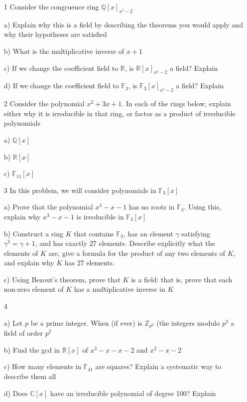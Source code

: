 \documentclass[12pt]{article}
\begin{document}
\begin{itemize}
	\item[1] Consider the congruence ring $\mathbb{Q}[x]_{x^5 -2}$

		a) Explain why this is a field by describing the theorems you would apply and why their hypotheses are satisfied

		b) What is the multiplicative inverse of $x+1$

		c) If we change the coefficient field to $\mathbb{R}$, is $\mathbb{R}[x]_{x^5 - 2}$ a field? Explain

		d) If we change the coefficient field to $\mathbb{F}_3$, is $\mathbb{F}_{3}[x]_{x^5-2}$ a field? Explain

	\item[2] Consider the polynomial $x^2 + 3x + 1$. In each of the rings below, explain either why it is irreducible in that ring, or factor as a product of irreducible polynomials

		a) $\mathbb{Q}[x]$

		b) $\mathbb{R}[x]$

		c) $\mathbb{F}_{11}[x]$

	\item[3] In this problem, we will consider polynomials in $\mathbb{F}_3[x]$

		a) Prove that the polynomial $x^3 - x - 1$ has no roots in $\mathbb{F}_3$. Using this, explain why $x^3 - x - 1$ is irreducible in $\mathbb{F}_3[x]$

		b) Construct a ring $K$ that contains $\mathbb{F}_3$, has an element $\gamma$ satisfying $\gamma^3 = \gamma + 1$, and has exactly 27 elements. Describe explicitly what the elements of $K$ are, give a formula for the product of any two elements of $K$, and explain why $K$ has 27 elements.

		c) Using Bezout's theorem, prove that $K$ is a field: that is, prove that each non-zero element of $K$ has a multiplicative inverse in $K$

	\item[4]

		a) Let $p$ be a prime integer. When (if ever) is $\mathbb{Z}_{p^2}$ (the integers modulo $p^2$ a field of order $p^2$

		b) Find the gcd in $\mathbb{R}[x]$ of $x^3 - x - x - 2$ and $x^2 - x - 2$

		c) How many elements in $\mathbb{F}_{41}$ are squares? Explain a systematic way to describe them all

		d) Does $\mathbb{C}[x]$ have an irreducible polynomial of degree 100? Explain


\end{itemize}
\end{document}
